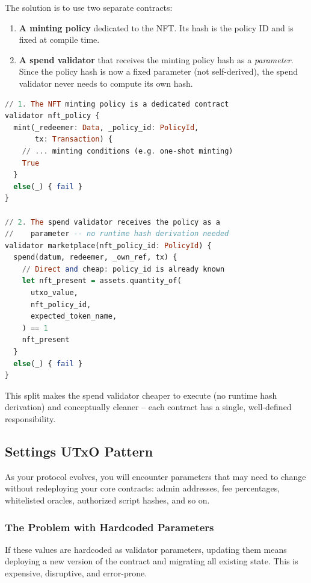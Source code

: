 The solution is to use two separate contracts:

\begin{enumerate}
    \item \textbf{A minting policy} dedicated to the NFT. Its hash is the policy ID and is fixed at compile time.
    \item \textbf{A spend validator} that receives the minting policy hash as a \textit{parameter}. Since the policy hash is now a fixed parameter (not self-derived), the spend validator never needs to compute its own hash.
\end{enumerate}

\begin{lstlisting}[language=haskell, caption=Clean split: separate minting policy and spend validator]
// 1. The NFT minting policy is a dedicated contract
validator nft_policy {
  mint(_redeemer: Data, _policy_id: PolicyId,
       tx: Transaction) {
    // ... minting conditions (e.g. one-shot minting)
    True
  }
  else(_) { fail }
}

// 2. The spend validator receives the policy as a
//    parameter -- no runtime hash derivation needed
validator marketplace(nft_policy_id: PolicyId) {
  spend(datum, redeemer, _own_ref, tx) {
    // Direct and cheap: policy_id is already known
    let nft_present = assets.quantity_of(
      utxo_value,
      nft_policy_id,
      expected_token_name,
    ) == 1
    nft_present
  }
  else(_) { fail }
}
\end{lstlisting}

This split makes the spend validator cheaper to execute (no runtime hash derivation) and conceptually cleaner -- each contract has a single, well-defined responsibility.

\subsection{Settings UTxO Pattern}

As your protocol evolves, you will encounter parameters that may need to change without redeploying your core contracts: admin addresses, fee percentages, whitelisted oracles, authorized script hashes, and so on.

\subsubsection{The Problem with Hardcoded Parameters}

If these values are hardcoded as validator parameters, updating them means deploying a new version of the contract and migrating all existing state. This is expensive, disruptive, and error-prone.

